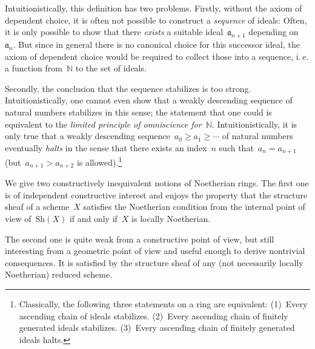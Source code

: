 \documentclass[10pt,reqno,a4paper]{amsbook}
\makeatletter
\theoremstyle{definition}
\theoremstyle{plain}
\theoremstyle{remark}
\newcommand{\NN}{\mathbb{N}}
\newcommand{\aaa}{\mathfrak{a}}
\newcommand{\Sh}{\mathrm{Sh}}
\newcommand{\?}{\,{:}\,}
\renewcommand{\_}{\mathpunct{.}\,}
\newcommand{\ie}{i.\,e.\@\xspace}
\makeatother
\begin{document}
Intuitionistically, this definition has two problems. Firstly, without the
axiom of dependent choice, it is often not possible to construct a
\emph{sequence} of ideals: Often, it is only possible to show that there
\emph{exists} a suitable ideal~$\aaa_{n+1}$ depending on~$\aaa_n$. But since in
general there is no canonical choice for this successor ideal, the axiom of dependent choice
would be required to collect those into a sequence, \ie a function from~$\NN$
to the set of ideals.

Secondly, the conclusion that the sequence stabilizes is too strong.
Intuitionistically, one cannot even show that a weakly descending sequence of
natural numbers stabilizes in this sense; the statement that one could is
equivalent to the \emph{limited principle of omniscience for~$\NN$}.
Intuitionistically, it is only true that a weakly descending sequence~$a_0 \geq
a_1 \geq \cdots$ of natural numbers eventually \emph{halts} in the sense that
there exists an index~$n$ such that~$a_n = a_{n+1}$ (but~$a_{n+1} > a_{n+2}$ is
allowed).\footnote{Classically, the following three statements on a ring are
equivalent: (1)~Every ascending chain of ideals stabilizes. (2)~Every ascending
chain of finitely generated ideals stabilizes. (3)~Every ascending chain of
finitely generated ideals halts.}

We give two constructively inequivalent notions of Noetherian rings. The first
one is of independent constructive interest and enjoys the property that the structure sheaf
of a scheme~$X$ satisfies the Noetherian condition from the internal point of
view of~$\Sh(X)$ if and only if~$X$ is locally Noetherian.

The second one is quite weak from a constructive point of view, but still
interesting from a geometric point of view and useful enough to derive
nontrivial consequences. It is satisfied by the structure sheaf of any (not
necessarily locally Noetherian) reduced scheme.
\end{document}

